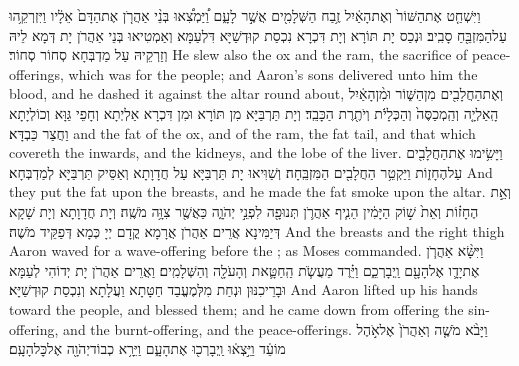 {וַיִּשְׁחַ֤ט אֶת\maqqaf הַשּׁוֹר֙ וְאֶת\maqqaf הָאַ֔יִל זֶ֥בַח הַשְּׁלָמִ֖ים אֲשֶׁ֣ר לָעָ֑ם וַ֠יַּמְצִ֠אוּ בְּנֵ֨י אַהֲרֹ֤ן אֶת\maqqaf הַדָּם֙ אֵלָ֔יו וַיִּזְרְקֵ֥הוּ עַל\maqqaf הַמִּזְבֵּ֖חַ סָבִֽיב׃}
{וּנְכַס יָת תּוֹרָא וְיָת דִּכְרָא נִכְסַת קוּדְשַׁיָּא דִּלְעַמָּא וְאַמְטִיאוּ בְּנֵי אַהֲרֹן יָת דְּמָא לֵיהּ וְזַרְקֵיהּ עַל מַדְבְּחָא סְחוֹר סְחוֹר׃}
{He slew also the ox and the ram, the sacrifice of peace-offerings, which was for the people; and Aaron’s sons delivered unto him the blood, and he dashed it against the altar round about,}{}
{וְאֶת\maqqaf הַחֲלָבִ֖ים מִן\maqqaf הַשּׁ֑וֹר וּמִ֨ן\maqqaf הָאַ֔יִל הָֽאַלְיָ֤ה וְהַֽמְכַסֶּה֙ וְהַכְּלָיֹ֔ת וְיֹתֶ֖רֶת הַכָּבֵֽד׃}
{וְיָת תַּרְבַּיָּא מִן תּוֹרָא וּמִן דִּכְרָא אַלְיְתָא וְחָפֵי גַּוָּא וְכוֹלְיָתָא וַחֲצַר כַּבְדָּא׃}
{and the fat of the ox, and of the ram, the fat tail, and that which covereth the inwards, and the kidneys, and the lobe of the liver.}{}
{וַיָּשִׂ֥ימוּ אֶת\maqqaf הַחֲלָבִ֖ים עַל\maqqaf הֶחָז֑וֹת וַיַּקְטֵ֥ר הַחֲלָבִ֖ים הַמִּזְבֵּֽחָה׃}
{וְשַׁוִּיאוּ יָת תַּרְבַּיָּא עַל חֲדָוָתָא וְאַסֵּיק תַּרְבַּיָּא לְמַדְבְּחָא׃}
{And they put the fat upon the breasts, and he made the fat smoke upon the altar.}{}
{וְאֵ֣ת הֶחָז֗וֹת וְאֵת֙ שׁ֣וֹק הַיָּמִ֔ין הֵנִ֧יף אַהֲרֹ֛ן תְּנוּפָ֖ה לִפְנֵ֣י יְהֹוָ֑ה כַּאֲשֶׁ֖ר צִוָּ֥ה מֹשֶֽׁה׃}
{וְיָת חֲדָוָתָא וְיָת שָׁקָא דְּיַמִּינָא אֲרֵים אַהֲרֹן אֲרָמָא קֳדָם יְיָ כְּמָא דְּפַקֵּיד מֹשֶׁה׃}
{And the breasts and the right thigh Aaron waved for a wave-offering before the \lord; as Moses commanded.}{}
{וַיִּשָּׂ֨א אַהֲרֹ֧ן אֶת\maqqaf יָדָ֛ו אֶל\maqqaf הָעָ֖ם וַֽיְבָרְכֵ֑ם וַיֵּ֗רֶד מֵעֲשֹׂ֧ת הַֽחַטָּ֛את וְהָעֹלָ֖ה וְהַשְּׁלָמִֽים׃}
{וַאֲרֵים אַהֲרֹן יָת יְדוֹהִי לְעַמָּא וּבָרֵיכִנּוּן וּנְחַת מִלְּמֶעֱבַד חַטָּתָא וַעֲלָתָא וְנִכְסַת קוּדְשַׁיָּא׃}
{And Aaron lifted up his hands toward the people, and blessed them; and he came down from offering the sin-offering, and the burnt-offering, and the peace-offerings.}{}
{וַיָּבֹ֨א מֹשֶׁ֤ה וְאַהֲרֹן֙ אֶל\maqqaf אֹ֣הֶל מוֹעֵ֔ד וַיֵּ֣צְא֔וּ וַֽיְבָרְכ֖וּ אֶת\maqqaf הָעָ֑ם וַיֵּרָ֥א כְבוֹד\maqqaf יְהֹוָ֖ה אֶל\maqqaf כׇּל\maqqaf הָעָֽם׃}
